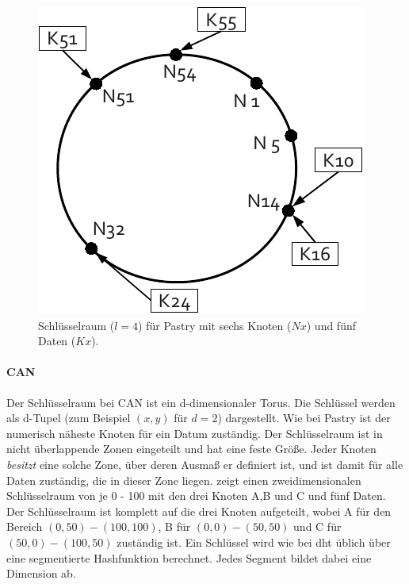 \begin{figure}[htb]
\centering
\includegraphics{grafics/pastry_key_space.pdf}
\caption{Schlüsselraum ($l=4$) für Pastry mit sechs Knoten ($Nx$) und fünf Daten ($Kx$).}
\label{fig:pastry_key_space}
\end{figure}


\paragraph{CAN}
Der Schlüsselraum bei CAN \cite{Ratnasamy2001Scalable} ist ein d-dimensionaler Torus. Die Schlüssel werden als d-Tupel (zum Beispiel $(x,y)$ für $d=2$) dargestellt. Wie bei Pastry ist der numerisch näheste Knoten für ein Datum zuständig. Der Schlüsselraum ist in nicht überlappende Zonen eingeteilt und hat eine feste Größe. Jeder Knoten \emph{besitzt} eine solche Zone, über deren Ausmaß er definiert ist, und ist damit für alle Daten zuständig, die in dieser Zone liegen.  zeigt einen zweidimensionalen Schlüsselraum von je 0 - 100 mit den drei Knoten A,B und C und fünf Daten. Der Schlüsselraum ist komplett auf die drei Knoten aufgeteilt, wobei A für den Bereich $(0,50)-(100,100)$, B für $(0,0)-(50,50)$ und C für $(50,0)-(100,50)$ zuständig ist. Ein Schlüssel wird wie bei \ac{dht} üblich über eine segmentierte Hashfunktion berechnet. Jedes Segment bildet dabei eine Dimension ab.

